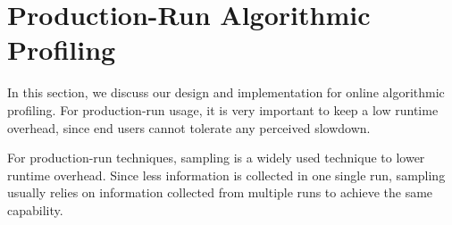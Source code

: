 \section{Production-Run Algorithmic Profiling}
\label{sec:online}

In this section, we discuss our design and 
implementation for online algorithmic profiling. 
For production-run usage, 
it is very important to keep a low runtime overhead, 
since end users cannot tolerate any perceived slowdown.  

For production-run techniques, 
sampling is a widely used technique to lower runtime overhead.
Since less information is collected in one single run,
sampling usually relies on information collected from 
multiple runs to achieve the same capability.  
